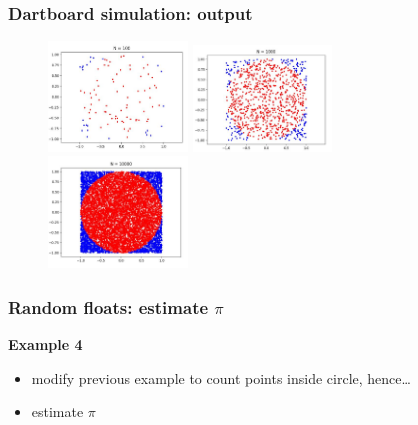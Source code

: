\documentclass[english,14pt]{beamer}
\begin{document}

\begin{frame}[fragile]

\frametitle{Dartboard simulation: output}


\begin{figure}[ht]
	\centering
	\includegraphics[width=0.33\textwidth]{figures/dartboard100}%
	\pause
	\includegraphics[width=0.33\textwidth]{figures/dartboard1000}%
	\pause
	\includegraphics[width=0.33\textwidth]{figures/dartboard10000}
\end{figure}

\end{frame}


\begin{frame}[fragile]

\frametitle{Random floats: estimate $\pi$}

\textbf{Example 4}\\
\vspace*{5mm}
\begin{itemize}
	\item modify previous example to count points inside circle, hence\ldots
	\item estimate $\pi$
\end{itemize}

\end{frame}
\end{document}
